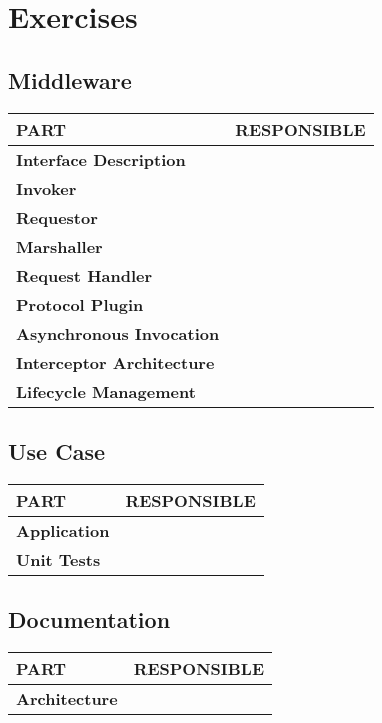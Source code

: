 \documentclass[a4paper]{article}
\begin{document}
\pagestyle{empty}
\section*{Exercises}
\vspace{0.5cm}
\subsection*{Middleware}

\begin{small}
\begin{tabular}{| p{4cm} | p{9cm} |}\hline
\textbf{PART} & \textbf{RESPONSIBLE}\\\hline\hline
\textbf{Interface Description} & \\\hline
\textbf{Invoker} & \\\hline
\textbf{Requestor} & \\\hline
\textbf{Marshaller} & \\\hline
\textbf{Request Handler} & \\\hline
\textbf{Protocol Plugin} & \\\hline
\textbf{Asynchronous Invocation} & \\\hline
\textbf{Interceptor Architecture} & \\\hline
\textbf{Lifecycle Management} & \\\hline\hline
\end{tabular}
\end{small}

\vspace{1cm}

\subsection*{Use Case}

\begin{small}
\begin{tabular}{| p{4cm} | p{9cm} |}\hline
\textbf{PART} & \textbf{RESPONSIBLE}\\\hline\hline
\textbf{Application} & \\\hline
\textbf{Unit Tests} & \\\hline
\end{tabular}
\end{small}


\vspace{1cm}

\subsection*{Documentation}

\begin{small}
\begin{tabular}{| p{4cm} | p{9cm} |}\hline
\textbf{PART} & \textbf{RESPONSIBLE}\\\hline\hline
\textbf{Architecture} & \\\hline
\end{tabular}
\end{small}
\end{document}
